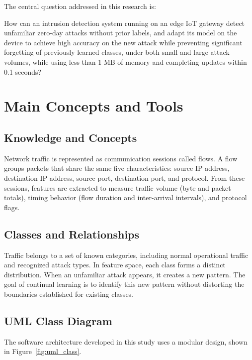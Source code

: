 The central question addressed in this research is:

How can an intrusion detection system running on an edge IoT gateway detect unfamiliar zero-day attacks without prior labels, and adapt its model on the device to achieve high accuracy on the new attack while preventing significant forgetting of previously learned classes, under both small and large attack volumes, while using less than 1 MB of memory and completing updates within 0.1 seconds?

\section{Main Concepts and Tools}
\label{sec:main_concepts_tools}

\subsection{Knowledge and Concepts}
\label{subsec:knowledge_concepts}
Network traffic is represented as communication sessions called flows. A flow groups packets that share the same five characteristics: source IP address, destination IP address, source port, destination port, and protocol. From these sessions, features are extracted to measure traffic volume (byte and packet totals), timing behavior (flow duration and inter-arrival intervals), and protocol flags.

\subsection{Classes and Relationships}
\label{subsec:classes_relationships}
Traffic belongs to a set of known categories, including normal operational traffic and recognized attack types. In feature space, each class forms a distinct distribution. When an unfamiliar attack appears, it creates a new pattern. The goal of continual learning is to identify this new pattern without distorting the boundaries established for existing classes.

\subsection{UML Class Diagram}
\label{subsec:uml_class_diagram}

The software architecture developed in this study uses a modular design, shown in Figure~\ref{fig:uml_class}.

